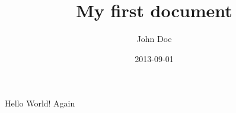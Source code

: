\documentclass{article}
\title{My first document}
\date{2013-09-01}
\author{John Doe}
\begin{document}
  \maketitle
  \newpage
  Hello World!
  \newpage
  Again
\end{document}
